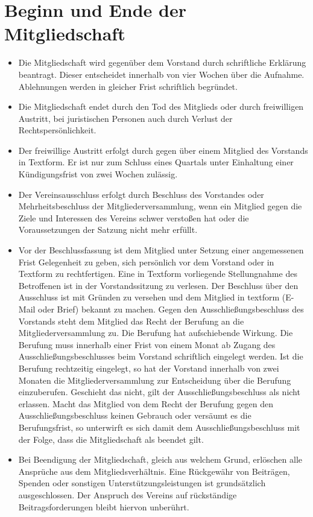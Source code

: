 \documentclass[a4paper,10pt]{article}
\begin{document}
\section{Beginn und Ende der Mitgliedschaft}
  \begin{itemize}
   \item Die Mitgliedschaft wird gegenüber dem Vorstand durch schriftliche Erklärung beantragt. Dieser entscheidet innerhalb von vier Wochen über die Aufnahme. Ablehnungen werden in gleicher Frist schriftlich begründet. 
   \item Die Mitgliedschaft endet durch den Tod des Mitglieds oder durch freiwilligen Austritt, bei juristischen Personen auch durch Verlust der Rechtspersönlichkeit. 
   \item Der freiwillige Austritt erfolgt durch gegen über einem Mitglied des Vorstands in Textform. Er ist nur zum Schluss eines Quartals unter Einhaltung einer Kündigungsfrist von zwei Wochen zulässig.
   \item Der Vereinsausschluss erfolgt durch Beschluss des Vorstandes oder Mehrheitsbeschluss der Mitgliederversammlung, wenn ein Mitglied gegen die Ziele und Interessen des Vereins schwer verstoßen hat oder die Voraussetzungen der Satzung nicht mehr erfüllt. 
   \item Vor der Beschlussfassung ist dem Mitglied unter Setzung einer angemessenen Frist Gelegenheit zu geben, sich persönlich vor dem Vorstand oder in Textform zu rechtfertigen. Eine in Textform vorliegende Stellungnahme des Betroffenen ist in der Vorstandssitzung zu verlesen. Der Beschluss über den Ausschluss ist mit Gründen zu versehen und dem Mitglied in textform (E-Mail oder Brief) bekannt zu machen. Gegen den Ausschließungsbeschluss des Vorstands steht dem Mitglied das Recht der Berufung an die Mitgliederversammlung zu. Die Berufung hat aufschiebende Wirkung. Die Berufung muss innerhalb einer Frist von einem Monat ab Zugang des Ausschließungsbeschlusses beim Vorstand schriftlich eingelegt werden. Ist die Berufung rechtzeitig eingelegt, so hat der Vorstand innerhalb von zwei Monaten die Mitgliederversammlung zur Entscheidung über die Berufung einzuberufen. Geschieht das nicht, gilt der Ausschließungsbeschluss als nicht erlassen. Macht das Mitglied von dem Recht der Berufung gegen den Ausschließungsbeschluss keinen Gebrauch oder versäumt es die Berufungsfrist, so unterwirft es sich damit dem Ausschließungsbeschluss mit der Folge, dass die Mitgliedschaft als beendet gilt.
   \item Bei Beendigung der Mitgliedschaft, gleich aus welchem Grund, erlöschen alle Ansprüche aus dem Mitgliedsverhältnis. Eine Rückgewähr von Beiträgen, Spenden oder sonstigen Unterstützungsleistungen ist grundsätzlich ausgeschlossen. Der Anspruch des Vereins auf rückständige Beitragsforderungen bleibt hiervon unberührt. 
  \end{itemize}
\end{document}
